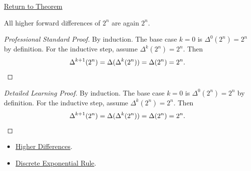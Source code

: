 \newpage
{}
\label{prf:higher-diff-two-n}

\begin{remark*}[Return]
\hyperref[prop:higher-diff-two-n]{Return to Theorem}
\end{remark*}

\begin{proposition*}
All higher forward differences of \(2^n\) are again \(2^n\).
\end{proposition*}

\begin{proof}[Professional Standard Proof]
\LRAProofBodyStart
By induction. The base case \(k = 0\) is \(\Delta^0(2^n) = 2^n\) by
definition. For the inductive step, assume \(\Delta^k(2^n) = 2^n\). Then
\[
\Delta^{k+1}(2^n) = \Delta(\Delta^k(2^n)) = \Delta(2^n) = 2^n. \qedhere
\]
\end{proof}

\begin{proof}[Detailed Learning Proof]
\LRAProofBodyStart
By induction. The base case \(k = 0\) is \(\Delta^0(2^n) = 2^n\) by
definition. For the inductive step, assume \(\Delta^k(2^n) = 2^n\). Then
\[
\Delta^{k+1}(2^n) = \Delta(\Delta^k(2^n)) = \Delta(2^n) = 2^n. \qedhere
\]
\end{proof}

\begin{remark*}
\end{remark*}

\begin{dependencies}
\begin{itemize}
  \item \hyperref[def:higher-differences]{Higher Differences}.
  \item \hyperref[prop:discrete-exponential-rule]{Discrete Exponential Rule}.
\end{itemize}
\end{dependencies}
\clearpage
